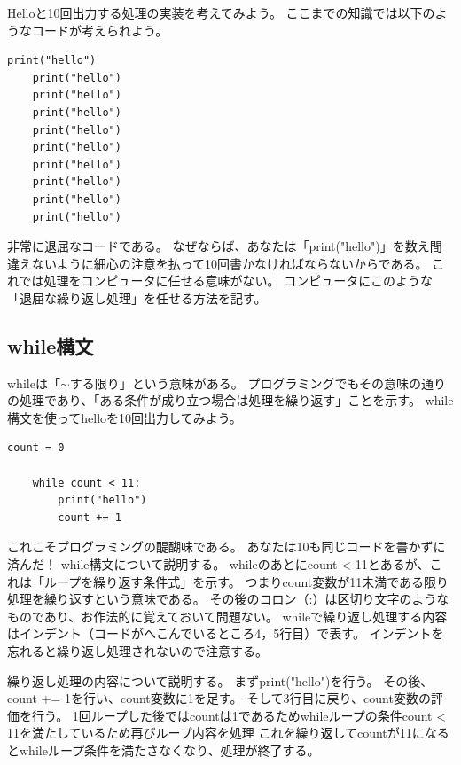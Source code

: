 \documentclass[]{ltjsarticle}
\begin{document}
	Helloと10回出力する処理の実装を考えてみよう。
	ここまでの知識では以下のようなコードが考えられよう。
	\begin{lstlisting}[caption=hellloop.py, label=helloloop]
	print("hello")
	print("hello")
	print("hello")
	print("hello")
	print("hello")
	print("hello")
	print("hello")
	print("hello")
	print("hello")
	print("hello")
	\end{lstlisting}
	非常に退屈なコードである。
	なぜならば、あなたは「print("hello")」を数え間違えないように細心の注意を払って10回書かなければならないからである。
	これでは処理をコンピュータに任せる意味がない。
	コンピュータにこのような「退屈な繰り返し処理」を任せる方法を記す。
	\subsection{while構文}
	whileは「$\sim$する限り」という意味がある。
	プログラミングでもその意味の通りの処理であり、「ある条件が成り立つ場合は処理を繰り返す」ことを示す。
	while構文を使ってhelloを10回出力してみよう。
	\begin{lstlisting}[caption=whileloop.py, label=hellowhile]
	count = 0

	while count < 11:
		print("hello")
		count += 1
	\end{lstlisting}
	これこそプログラミングの醍醐味である。
	あなたは10も同じコードを書かずに済んだ！
	while構文について説明する。
	whileのあとにcount < 11とあるが、これは「ループを繰り返す条件式」を示す。
	つまりcount変数が11未満である限り処理を繰り返すという意味である。
	その後のコロン（:）は区切り文字のようなものであり、お作法的に覚えておいて問題ない。
	whileで繰り返し処理する内容はインデント（コードがへこんでいるところ4，5行目）で表す。
	インデントを忘れると繰り返し処理されないので注意する。

	繰り返し処理の内容について説明する。
	まずprint("hello")を行う。
	その後、count += 1を行い、count変数に1を足す。
	そして3行目に戻り、count変数の評価を行う。
	1回ループした後ではcountは1であるためwhileループの条件count < 11を満たしているため再びループ内容を処理
	これを繰り返してcountが11になるとwhileループ条件を満たさなくなり、処理が終了する。

	



	
\end{document}
